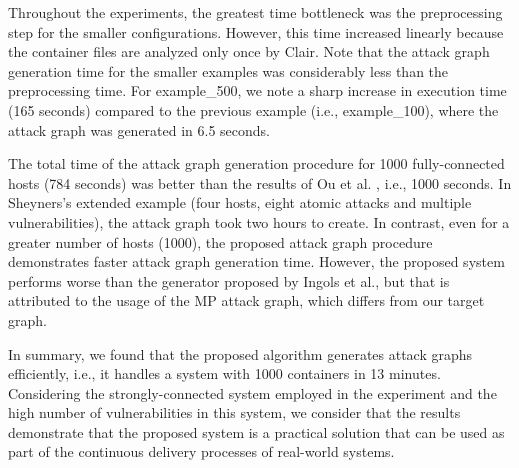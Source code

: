 Throughout the experiments, the greatest time bottleneck was the preprocessing step for the smaller configurations. However, this time increased linearly because the container files are analyzed only once by Clair. Note that the attack graph generation time for the smaller examples was considerably less than the preprocessing time. For example\_500, we note a sharp increase in execution time (165 seconds) compared to the previous example (i.e., example\_100), where the attack graph was generated in 6.5 seconds.

The total time of the attack graph generation procedure for 1000 fully-connected hosts (784 seconds) was better than the results of Ou et al. \cite{ou2006scalable}, i.e., 1000 seconds. In Sheyners's extended example (four hosts, eight atomic attacks and multiple vulnerabilities), the attack graph took two hours to create. In contrast, even for a greater number of hosts (1000), the proposed attack graph procedure demonstrates faster attack graph generation time. However, the proposed system performs worse than the generator proposed by Ingols et al., but that is attributed to the usage of the MP attack graph, which differs from our target graph. 

In summary, we found that the proposed algorithm generates attack graphs efficiently, i.e., it handles a system with 1000 containers in 13 minutes. Considering the strongly-connected system employed in the experiment and the high number of vulnerabilities in this system, we consider that the results demonstrate that the proposed system is a practical solution that can be used as part of the continuous delivery processes of real-world systems. 